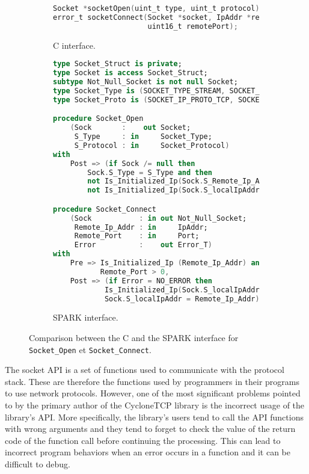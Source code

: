 \documentclass[runningheads]{llncs}
\begin{document}
\begin{figure}[t]
\begin{subfigure}{\textwidth}
\begin{lstlisting}[language=C, frame=bottomline]
Socket *socketOpen(uint_t type, uint_t protocol);
error_t socketConnect(Socket *socket, IpAddr *remoteIpAddr,
                      uint16_t remotePort);
\end{lstlisting}
\caption{C interface.}
\label{Fig:socketInterface:C}
\end{subfigure}
\begin{subfigure}{\textwidth}
\begin{lstlisting}[language=Ada, frame=bottomline]
type Socket_Struct is private;
type Socket is access Socket_Struct;
subtype Not_Null_Socket is not null Socket;
type Socket_Type is (SOCKET_TYPE_STREAM, SOCKET_TYPE_DGRAM);
type Socket_Proto is (SOCKET_IP_PROTO_TCP, SOCKET_IP_PROTO_UDP);

procedure Socket_Open
    (Sock       :    out Socket;
     S_Type     : in     Socket_Type;
     S_Protocol : in     Socket_Protocol)
with
    Post => (if Sock /= null then
        Sock.S_Type = S_Type and then
        not Is_Initialized_Ip(Sock.S_Remote_Ip_Addr) and then
        not Is_Initialized_Ip(Sock.S_localIpAddr));

procedure Socket_Connect
    (Sock           : in out Not_Null_Socket;
     Remote_Ip_Addr : in     IpAddr;
     Remote_Port    : in     Port;
     Error          :    out Error_T)
with
    Pre => Is_Initialized_Ip (Remote_Ip_Addr) and then
           Remote_Port > 0,
    Post => (if Error = NO_ERROR then
            Is_Initialized_Ip(Sock.S_localIpAddr) and then
            Sock.S_localIpAddr = Remote_Ip_Addr);
\end{lstlisting}
\caption{SPARK interface.}
\label{Fig:socketInterface:SPARK}
\end{subfigure}
\caption{Comparison between the C and the SPARK interface for \texttt{Socket\_Open} et \texttt{Socket\_Connect}.}
\label{Fig:socketInterface}
\end{figure}

    The socket API is a set of functions used to communicate with the protocol stack. These are therefore the functions used
    by programmers in their programs to use network protocols. However, one of the most significant problems pointed to by the
    primary author of the CycloneTCP library is the incorrect usage of the library's API. More specifically, the library's users
    tend to call the API functions with wrong arguments and they tend to forget to check the value of the return code of the
    function call before continuing the processing. This can lead to incorrect program behaviors when an error occurs in a function
    and it can be difficult to debug.
\end{document}
